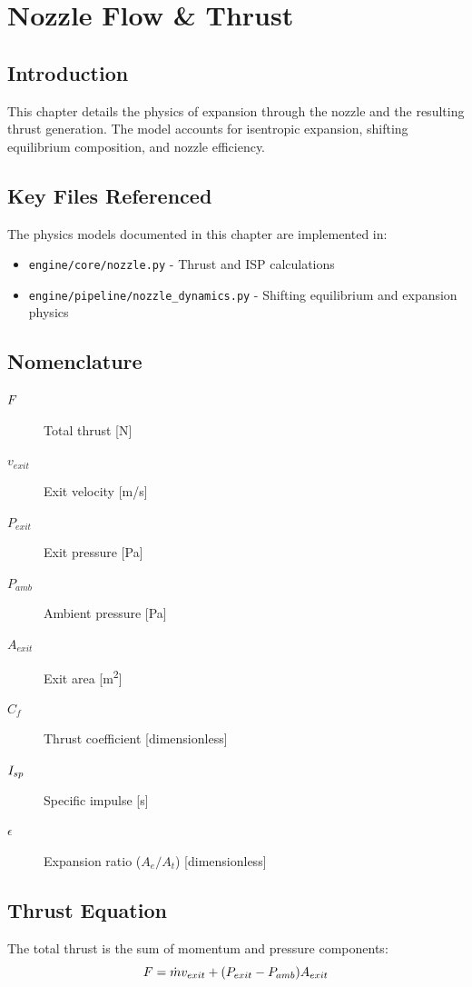 \section{Nozzle Flow \& Thrust}

\subsection{Introduction}
This chapter details the physics of expansion through the nozzle and the resulting thrust generation. The model accounts for isentropic expansion, shifting equilibrium composition, and nozzle efficiency.

\subsection{Key Files Referenced}
The physics models documented in this chapter are implemented in:
\begin{itemize}
    \item \texttt{engine/core/nozzle.py} - Thrust and ISP calculations
    \item \texttt{engine/pipeline/nozzle_dynamics.py} - Shifting equilibrium and expansion physics
\end{itemize}

\subsection{Nomenclature}
\begin{description}
    \item[$F$] Total thrust [\si{N}]
    \item[$v_{exit}$] Exit velocity [\si{m/s}]
    \item[$P_{exit}$] Exit pressure [\si{Pa}]
    \item[$P_{amb}$] Ambient pressure [\si{Pa}]
    \item[$A_{exit}$] Exit area [\si{m^2}]
    \item[$C_f$] Thrust coefficient [dimensionless]
    \item[$I_{sp}$] Specific impulse [\si{s}]
    \item[$\epsilon$] Expansion ratio ($A_e/A_t$) [dimensionless]
\end{description}

\subsection{Thrust Equation}
The total thrust is the sum of momentum and pressure components:
\begin{equation}
F = \dot{m} v_{exit} + (P_{exit} - P_{amb}) A_{exit}
\end{equation}

